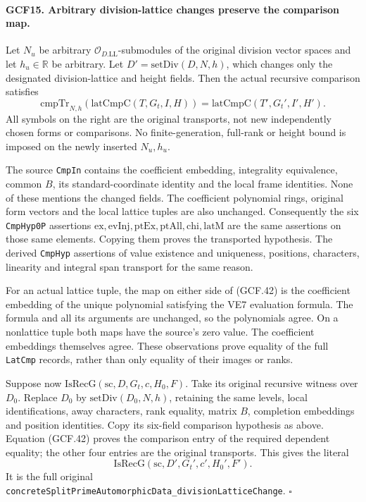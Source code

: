 \paragraph{GCF15. Arbitrary division-lattice changes preserve the comparison map.}
\label{claim:GCF15}
Let \(N_u\) be arbitrary \(\mathcal O_{D.\mathrm{LL}}\)-submodules
of the original division vector spaces and let \(h_u\in\mathbb R\)
be arbitrary.  Let \(D'=\mathrm{setDiv}(D,N,h)\), which changes
only the designated division-lattice and height fields.  Then the
actual recursive comparison satisfies
\[
 \mathrm{cmpTr}_{N,h}(\mathrm{latCmpC}(T,G_t,I,H))
   =\mathrm{latCmpC}(T',G_t',I',H').                  \tag{GCF.42}
\]
All symbols on the right are the original transports, not new
independently chosen forms or comparisons.  No finite-generation,
full-rank or height bound is imposed on the newly inserted \(N_u,h_u\).

The source \texttt{CmpIn} contains the coefficient embedding,
integrality equivalence, common \(B\), its standard-coordinate
identity and the local frame identities.  None of these mentions
the changed fields.  The coefficient polynomial rings, original
form vectors and the local lattice tuples are also unchanged.
Consequently the six \texttt{CmpHyp0P} assertions
\(\mathrm{ex},\mathrm{evInj},\mathrm{ptEx},\mathrm{ptAll},
\mathrm{chi},\mathrm{latM}\) are the same assertions on those
same elements.  Copying them proves the transported hypothesis.
The derived \texttt{CmpHyp} assertions of value existence and
uniqueness, positions, characters, linearity and integral span
transport for the same reason.

For an actual lattice tuple, the map on either side of (GCF.42)
is the coefficient embedding of the unique polynomial satisfying
the VE7 evaluation formula.  The formula and all its arguments are
unchanged, so the polynomials agree.  On a nonlattice tuple both
maps have the source's zero value.  The coefficient embeddings
themselves agree.  These observations prove equality of the full
\texttt{LatCmp} records, rather than only equality of their images
or ranks.

Suppose now \(\mathrm{IsRecG}(\mathrm{sc},D,G_t,c,H_0,F)\).
Take its original recursive witness over \(D_0\).  Replace \(D_0\)
by \(\mathrm{setDiv}(D_0,N,h)\), retaining the same levels,
local identifications, away characters, rank equality, matrix \(B\),
completion embeddings and position identities.  Copy its six-field
comparison hypothesis as above.  Equation (GCF.42) proves the
comparison entry of the required dependent equality; the other four
entries are the original transports.  This gives the literal
\[
 \mathrm{IsRecG}(\mathrm{sc},D',G_t',c',H_0',F').        \tag{GCF.43}
\]
It is the full original
\texttt{concreteSplitPrimeAutomorphicData\_divisionLatticeChange}.
\hfill\(\square\)

